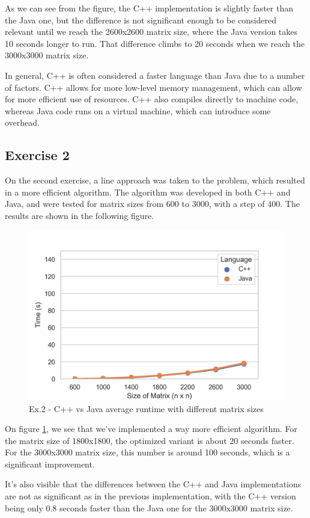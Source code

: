 \documentclass[10pt, titlepage]{extarticle}
\begin{document}
As we can see from the figure, the C++ implementation is slightly faster than the Java one, but the difference is not significant
enough to be considered relevant until we reach the 2600x2600 matrix size, where the Java version takes 10 seconds longer to run. That difference climbs to
20 seconds when we reach the 3000x3000 matrix size.
\par
In general, C++ is often considered a faster language than Java due to a number of factors.
C++ allows for more low-level memory management, which can allow for more efficient use of resources.
C++ also compiles directly to machine code, whereas Java code runs on a virtual machine,
which can introduce some overhead.


\subsection{Exercise 2}\label{Exercise 2}

On the second exercise, a line approach was taken to the problem, which resulted in a more efficient algorithm.
The algorithm was developed in both C++ and Java, and were tested for matrix sizes from 600 to 3000, with a step of 400.
The results are shown in the following figure.

\begin{figure}[H]
    \centering
    \includegraphics[width=0.5\linewidth]{../plots/ex2/ex2a-overall.png}
    \caption{Ex.2 - C++ vs Java average runtime with different matrix sizes}
    \label{ex2-overall}
\end{figure}

On figure \ref{ex2-overall}, we see that we've implemented a way more efficient algorithm. For the matrix size of 1800x1800, the optimized variant
is about 20 seconds faster. For the 3000x3000 matrix size, this number is around 100 seconds, which is a significant improvement.

It's also visible that the differences between the C++ and Java implementations are not as significant as in the
previous implementation, with the C++ version being only 0.8 seconds faster than the Java one for the 3000x3000 matrix size.
\end{document}

